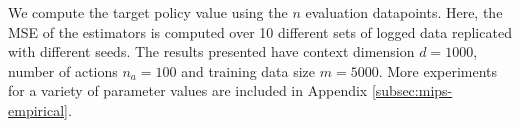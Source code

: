 We compute the target policy value using the $n$ evaluation datapoints. Here, the MSE of the estimators is computed over 10 different sets of logged data replicated with different seeds. The results presented have context dimension $d=1000$, number of actions $n_a=100$ and training data size $m=5000$. More experiments for a variety of parameter values are included in Appendix \ref{subsec:mips-empirical}.


